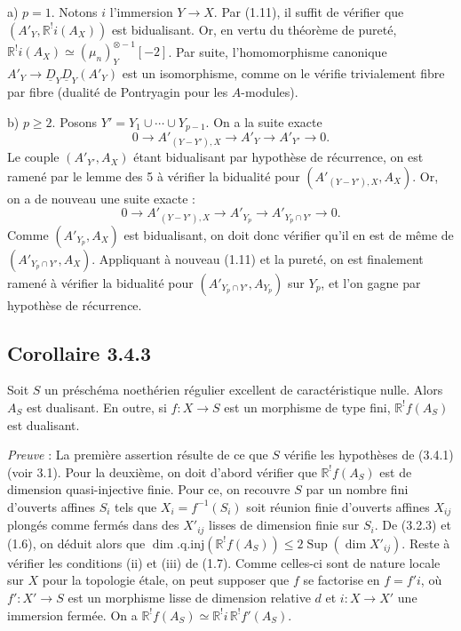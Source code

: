 \documentclass[11pt]{article}
\newcommand{\R}{\mathbb{R}}\newcommand{\RHomCore}{\mathbb{R}\mathrm{Hom}}
\providecommand{\R}{\mathrm R}
\begin{document}
a) $p = 1$. Notons $i$ l'immersion $Y \to X$. Par (1.11), il suffit de vérifier que $(A'_Y, \R^{!}i(A_X))$ est bidualisant. Or, en vertu du théorème de pureté, $\R^{!}i(A_X) \simeq (\mu_n)^{\otimes -1}_Y[-2]$. Par suite, l'homomorphisme canonique $A'_Y \to \underline{D}_Y \underline{D}_Y(A'_Y)$ est un isomorphisme, comme on le vérifie trivialement fibre par fibre (dualité de Pontryagin pour les $A$-modules).

b) $p \geqslant 2$. Posons $Y' = Y_1 \cup \cdots \cup Y_{p-1}$. On a la suite exacte
\[
0 \longrightarrow A'_{(Y-Y'),X} \longrightarrow A'_Y \longrightarrow A'_{Y'} \longrightarrow 0.
\]
Le couple $(A'_{Y'}, A_X)$ étant bidualisant par hypothèse de récurrence, on est ramené par le lemme des 5 à vérifier la bidualité pour $(A'_{(Y-Y'),X}, A_X)$. Or, on a de nouveau une suite exacte :
\[
0 \longrightarrow A'_{(Y-Y'),X} \longrightarrow A'_{Y_p} \longrightarrow A'_{Y_p \cap Y'} \longrightarrow 0.
\]
Comme $(A'_{Y_p}, A_X)$ est bidualisant, on doit donc vérifier qu'il en est de même de $(A'_{Y_p \cap Y'}, A_X)$. Appliquant à nouveau (1.11) et la pureté, on est finalement ramené à vérifier la bidualité pour $(A'_{Y_p \cap Y'}, A_{Y_p})$ sur $Y_p$, et l'on gagne par hypothèse de récurrence.

\subsection*{Corollaire 3.4.3}
Soit $S$ un préschéma noethérien régulier excellent de caractéristique nulle. Alors $A_S$ est dualisant. En outre, si $f : X \to S$ est un morphisme de type fini, $\R^{!}f(A_S)$ est dualisant.

\emph{Preuve} : La première assertion résulte de ce que $S$ vérifie les hypothèses de (3.4.1) (voir 3.1). Pour la deuxième, on doit d'abord vérifier que $\R^{!}f(A_S)$ est de dimension quasi-injective finie. Pour ce, on recouvre $S$ par un nombre fini d'ouverts affines $S_i$ tels que $X_i = f^{-1}(S_i)$ soit réunion finie d'ouverts affines $X_{ij}$ plongés comme fermés dans des $X'_{ij}$ lisses de dimension finie sur $S_i$. De (3.2.3) et (1.6), on déduit alors que $\dim.\mathrm{q.inj}(\R^{!}f(A_S)) \leqslant 2\operatorname{Sup}(\dim X'_{ij})$. Reste à vérifier les conditions (ii) et (iii) de (1.7). Comme celles-ci sont de nature locale sur $X$ pour la topologie étale, on peut supposer que $f$ se factorise en $f = f'i$, où $f' : X' \to S$ est un morphisme lisse de dimension relative $d$ et $i : X \to X'$ une immersion fermée. On a $\R^{!}f(A_S) \simeq \R^{!}i \, \R^{!}f'(A_S)$.
\end{document}
